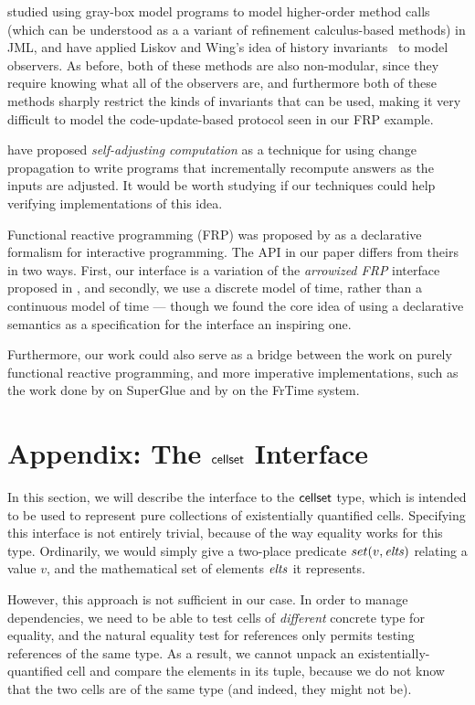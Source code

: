 \citet{shaner-leavens-naumann} studied using gray-box model programs
to model higher-order method calls (which can be understood as a a
variant of refinement calculus-based methods) in JML, and
\citet{history-invariants} have applied Liskov and Wing's idea of
history invariants~\cite{liskov-wing} to model observers. As before,
both of these methods are also non-modular, since they require knowing
what all of the observers are, and furthermore both of these methods
sharply restrict the kinds of invariants that can be used, making it
very difficult to model the code-update-based protocol seen in our FRP
example.

\citet{self-adjusting} have proposed
\emph{self-adjusting computation} as a technique for using change
propagation to write programs that incrementally
recompute answers as the inputs are adjusted. It would be worth 
studying if our techniques could help verifying implementations of this
idea.

Functional reactive programming (FRP) was proposed by \citet{frp} as a
declarative formalism for interactive programming. The API in our
paper differs from theirs in two ways. First, our interface is a
variation of the \emph{arrowized FRP} interface proposed in
\cite{afrp}, and secondly, we use a discrete model of time, rather
than a continuous model of time --- though we found the core idea of
using a declarative semantics as a specification for the interface an
inspiring one.

Furthermore, our work could also serve as a bridge between the work on
purely functional reactive programming, and more imperative
implementations, such as the work done by \citet{superglue} on
SuperGlue and by \citet{frtime} on the FrTime system.


\section{Appendix: The $\mathsf{cellset}$ Interface}

In this section, we will describe the interface to the $\mathsf{cellset}$ type,
which is intended to be used to represent pure collections of
existentially quantified cells. Specifying this interface is not
entirely trivial, because of the way equality works for this
type. Ordinarily, we would simply give a two-place predicate $set(v,
\mathit{elts})$ relating a value $v$, and the mathematical set of elements
$\mathit{elts}$ it represents.

However, this approach is not sufficient in our case. In order to
manage dependencies, we need to be able to test cells of
\emph{different} concrete type for equality, and the natural equality
test for references only permits testing references of the same
type. As a result, we cannot unpack an existentially-quantified cell
and compare the elements in its tuple, because we do not know that the
two cells are of the same type (and indeed, they might not be).

